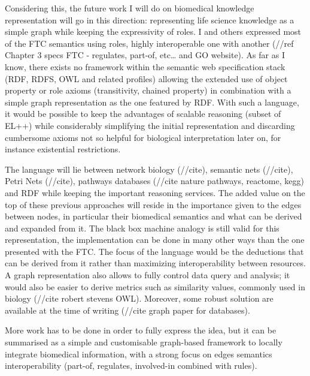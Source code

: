 Considering this, the future work I will do on biomedical knowledge representation will go in this direction: representing life science knowledge as a simple graph while keeping the expressivity of roles. I and others expressed most of the FTC semantics using roles, highly interoperable one with another (//ref Chapter 3 specs FTC - regulates, part-of, etc… and GO website). As far as I know, there exists no framework within the semantic web specification stack (RDF, RDFS, OWL and related profiles) allowing the extended use of object property or role axioms (transitivity, chained property) in combination with a simple graph representation as the one featured by RDF. With such a language, it would be possible to keep the advantages of scalable reasoning (subset of EL++) while considerably simplifying the initial representation and discarding cumbersome axioms not so helpful for biological interpretation later on, for instance existential restrictions.

The language will lie between network biology (//cite), semantic nets (//cite), Petri Nets (//cite), pathways databases (//cite nature pathways, reactome, kegg) and RDF while keeping the important reasoning services. The added value on the top of these previous approaches will reside in the importance given to the edges between nodes, in particular their biomedical semantics and what can be derived and expanded from it. The black box machine analogy is still valid for this representation, the implementation can be done in many other ways than the one presented with the FTC. The focus of the language would be the deductions that can be derived from it rather than maximizing interoperability between resources. A graph representation also allows to fully control data query and analysis; it would also be easier to derive metrics such as similarity values, commonly used in biology (//cite robert stevens OWL). Moreover, some robust solution are available at the time of writing (//cite graph paper for databases).

More work has to be done in order to fully express the idea, but it can be summarised as a simple and customisable graph-based framework to locally integrate biomedical information, with a strong focus on edges semantics interoperability (part-of, regulates, involved-in combined with rules).

